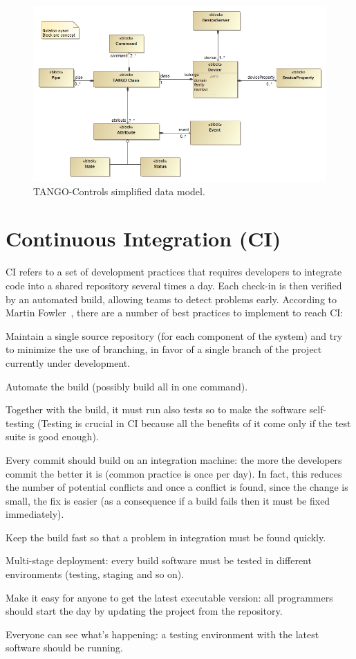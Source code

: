 \documentclass[a4paper,
               keeplastbox,   %
               ]{jacow}
\begin{document}
\begin{figure}[!htb]
   \centering
   \includegraphics*[width=1\columnwidth]{SimplifiedDataModel}
   \caption{TANGO-Controls simplified data model.}
   \label{fig:tangodatamodel}
\end{figure}

\section{Continuous Integration (CI)}
CI refers to a set of development practices that requires developers to integrate code into a shared repository several times a day. Each check-in is then verified by an automated build, allowing teams to detect problems early.
According to Martin Fowler~\cite{CI}, there are a number of best practices to implement to reach CI: 
\begin{Itemize}
    \item Maintain a single source repository (for each component of the system) and try to minimize the use of branching, in favor of a single branch of the project currently under development.
    \item Automate the build (possibly build all in one command).
    \item Together with the build, it must run also tests so to make the software self-testing (Testing is crucial in CI because all the benefits of it come only if the test suite is good enough).
    \item Every commit should build on an integration machine: the more the developers commit the better it is (common practice is once per day). In fact, this reduces the number of potential conflicts and once a conflict is found, since the change is small, the fix is easier (as a consequence if a build fails then it must be fixed immediately).
    \item Keep the build fast so that a problem in integration must be found quickly.
    \item Multi-stage deployment: every build software must be tested in different environments (testing, staging and so on).
    \item Make it easy for anyone to get the latest executable version: all programmers should start the day by updating the project from the repository.
    \item Everyone can see what’s happening: a testing environment with the latest software should be running.
\end{Itemize}
\end{document}
